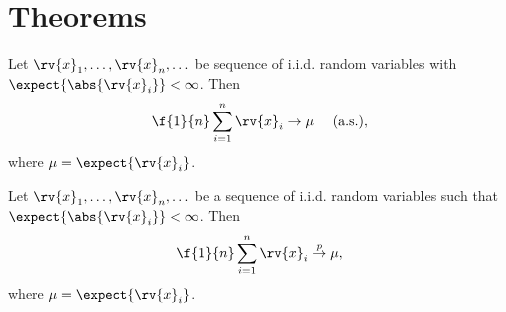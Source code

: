 \section{Theorems}
\begin{theoremBox}
   Let $\rv{x}_{1},\ldots,\rv{x}_{n}, \ldots$ be sequence of i.i.d. random variables with $\expect{\abs{\rv{x}_{i}}}<\infty$. Then
   \begin{align}
       \f{1}{n}\sum_{i=1}^{n} \rv{x}_{i} \to \mu \quad \text{ (a.s.)},
   \end{align}
   where $\mu = \expect{\rv{x}_{i}}$.    
\end{theoremBox}

\begin{theoremBox}
     Let $\rv{x}_{1}, \ldots, \rv{x}_{n}, \ldots$ be a sequence of i.i.d. random variables such that $\expect{\abs{\rv{x}_{i}}}<\infty$. Then
     \begin{align}
         \f{1}{n}\sum_{i=1}^{n}\rv{x}_{i} \overset{p}{\to}\mu,
     \end{align}
     where $\mu = \expect{\rv{x}_{i}}$.
\end{theoremBox}

